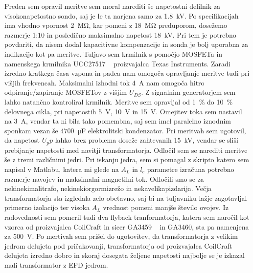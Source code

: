 \documentclass[a4paper,twoside,openright,12pt,slovene]{book}
\begin{document}
Preden sem opravil meritve sem moral narediti še napetostni delilnik za visokonapetostno sondo, saj je le ta narjena samo za \SI{1.8}{\kilo\volt}. Po specifikacijah ima vhodno vpornost \SI{2}{\mega\ohm}, kar pomeni z \SI{18}{\mega\ohm} preduporom, dosežemo razmerje 1:10 in posledično maksimalno napetost \SI{18}{\kilo\volt}. Pri tem je potrebno povdariti, da nisem dodal kapacitivne kompenzacije in sonda je bolj uporabna za indikacijo kot pa meritve. Tuljavo sem krmilnik s pomočjo MOSFETa in namenskega krmilnika UCC27517 ~\cite{TI:UCC28740} proizvajalca Texas Instruments. Zaradi izredno kratkega časa vzpona in padca nam omogoča opravljanje meritve tudi pri višjih frekvencah. Maksimalni izhodni tok \SI{4}{\ampere} nam omogoča hitro odpiranje/zapiranje MOSFETov z višjim \(U_{DS}\). Z signalnim generatorjem sem lahko natančno kontroliral krmilnik. Meritve sem opravljal od \SI{1}{\percent} do \SI{10}{\percent} delovnega cikla, pri napetostih \SI{5}{\volt}, \SI{10}{\volt} in \SI{15}{\volt}. Omejitev toka sem nastavil na \SI{3}{\ampere}, vendar ta ni bila tako pomembna, saj sem imel paralelno iznodnim sponkam vezan še \SI{4700}{\micro\farad} elektrolitski kondenzator. Pri meritvah sem ugotovil, da napetost \(U_pp\) lahko brez problema doseže zahtevanih \SI{15}{\kilo\volt}, vendar se sliši prebijanje napetosti med navitji transformatorja. Odločil sem se narediti meritve še z tremi različnimi jedri. Pri iskanju jedra, sem si pomagal z skripto katero sem napisal v Matlabu, katera mi glede na \(A_L\) in \(l_e\) parametre izračuna potrebno razmerje navojev in maksimalni magnetilni tok. Odločili smo se za nekinekimalitrafo, nekinekiorgormizrežo in nekavelikapizdarija. Večja transformatorja sta izgledala zelo obetavno, saj bi na tuljavniku lažje zagotavljal primerno izolacijo ter visoka \(A_L\) vrednost pomeni manjše število ovojev. Iz radovednosti sem pomeril tudi dva flyback tranformatorja, katera sem naročil kot vzorca od proizvajalca CoilCraft in sicer GA3459 ~\cite{Coilcraft:GA3459} in GA3460, sta pa namenjena za \SI{500}{\volt}. Po mertivah sem prišel do ugotovitev, da transformatorja z velikim jedrom delujeta pod pričakovanji, transformatorja od proizvajalca CoilCraft delujeta izredno dobro in skoraj dosegata željene napetosti najbolje se je izkazal mali transformator z EFD jedrom. 
 
\end{document}
